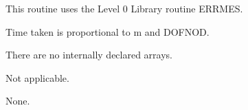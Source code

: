 \begin{routines}
This routine uses the Level 0 Library routine ERRMES.
\end{routines}
\begin{timing}
Time taken is proportional to m and DOFNOD.
\end{timing}
\begin{storage}
There are no internally declared arrays.
\end{storage}
\begin{accuracy}
Not applicable.
\end{accuracy}
\begin{comments}
None.
\end{comments}

